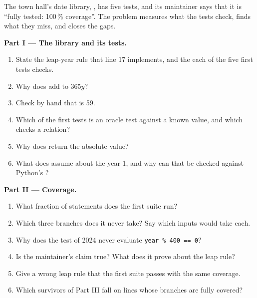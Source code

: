 \begin{problem}\label{pb:b3:software-engineering:1}
The town hall's date library, , has five tests, and its maintainer says that it is ``fully tested: 100\,\% coverage''. The problem measures what the tests check, finds what they miss, and closes the gaps.

\label{lst:b3:software-engineering:towndate}

\label{out:b3:software-engineering:datemut}

\medskip\noindent\textbf{Part I --- The library and its tests.}
\begin{enumerate}
  \item State the leap-year rule that line 17 implements, and the  each of the five first tests checks.
  \item Why does  add  to $365y$?
  \item Check by hand that  is 59.
  \item Which of the first tests is an oracle test against a known value, and which checks a relation?
  \item Why does  return the absolute value?
  \item What does  assume about the year 1, and why can that be checked against Python's ?
\end{enumerate}

\medskip\noindent\textbf{Part II --- Coverage.}
\begin{enumerate}[resume]
  \item What fraction of statements does the first suite run?
  \item Which three branches does it never take? Say which inputs would take each.
  \item Why does the test of 2024 never evaluate \texttt{year \% 400 == 0}?
  \item Is the maintainer's claim true? What does it prove about the leap rule?
  \item Give a wrong leap rule that the first suite passes with the same coverage.
  \item Which survivors of Part III fall on lines whose branches are fully covered?
\end{enumerate}


\end{problem}
